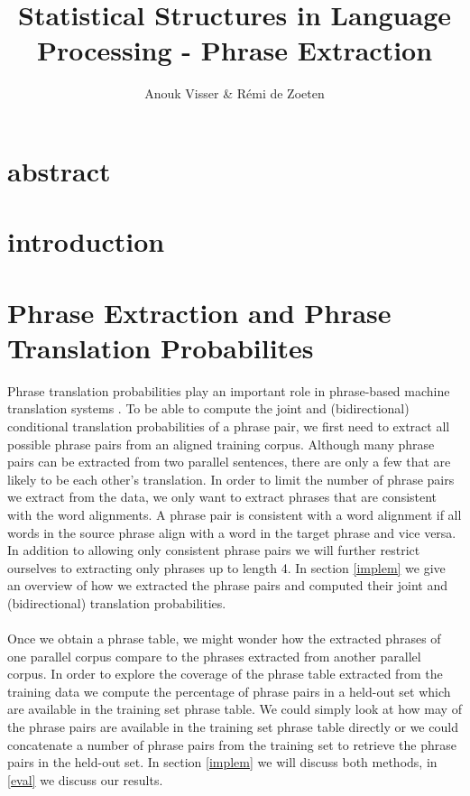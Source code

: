 \documentclass[11pt]{article}
\title{Statistical Structures in Language Processing - Phrase Extraction}
\author{Anouk Visser \& R\'emi de Zoeten}
\date{}                                           %
\begin{document}
\maketitle
\newpage
\tableofcontents
\newpage

\section{abstract}
\section{introduction}
\section{Phrase Extraction and Phrase Translation Probabilites}
Phrase translation probabilities play an important role in phrase-based machine translation systems \cite{koehn}. To be able to compute the joint and (bidirectional) conditional translation probabilities of a phrase pair, we first need to extract all possible phrase pairs from an aligned training corpus. Although many phrase pairs can be extracted from two parallel sentences, there are only a few that are likely to be each other's translation. In order to limit the number of phrase pairs we extract from the data, we only want to extract phrases that are consistent with the word alignments. A phrase pair is consistent with a word alignment if all words in the source phrase align with a word in the target phrase and vice versa.  In addition to allowing only consistent phrase pairs we will further restrict ourselves to extracting only phrases up to length 4. In section \ref{implem} we give an overview of how we extracted the phrase pairs and computed their joint and (bidirectional) translation probabilities.\\\\
Once we obtain a phrase table, we might wonder how the extracted phrases of one parallel corpus compare to the phrases extracted from another parallel corpus. In order to explore the coverage of the phrase table extracted from the training data we compute the percentage of phrase pairs in a held-out set which are available in the training set phrase table. We could simply look at how may of the phrase pairs are available in the training set phrase table directly or we could concatenate a number of phrase pairs from the training set to retrieve the phrase pairs in the held-out set. In section \ref{implem} we will discuss both methods, in \ref{eval} we discuss our results.
\end{document}
